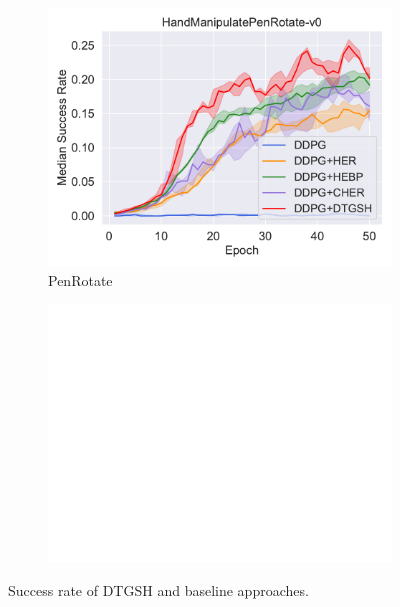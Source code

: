 \begin{figure}
\begin{subfigure}[t]{0.33\textwidth}
    \includegraphics[width=\textwidth]{figures/chapter4/HandManipulatePenRotate-v0.pdf}
    \caption{PenRotate}
    \label{subfig:baseline_handpen}
  \end{subfigure}\hfill
  \begin{subfigure}[t]{0.33\textwidth}
    \includegraphics[width=\textwidth]{figures/chapter4/blank.png}
  \end{subfigure}\hfill
  \caption{Success rate of DTGSH and baseline approaches.} 
  \label{fig:baseline_compare}
\end{figure}


